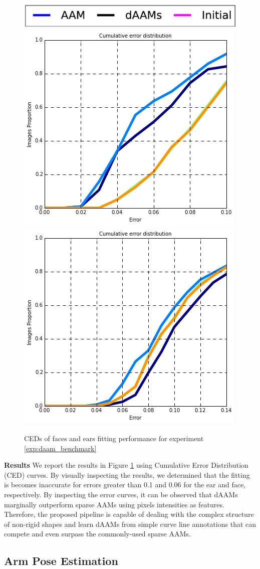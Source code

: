 \begin{figure}[b!]
    \centering
    \includegraphics[width=0.6\columnwidth]{resources/DAAMBenchmark/legend}
    \\
    \includegraphics[width=0.48\columnwidth]{resources/DAAMBenchmark/face}
    \includegraphics[width=0.48\columnwidth]{resources/DAAMBenchmark/ear}
    \caption{CEDs of faces and ears fitting performance for experiment \ref{exp:daam_benchmark}}
    \label{fig:daam_benchmark}
\end{figure}

\noindent\textbf{Results} We report the results in Figure \ref{fig:daam_benchmark} using Cumulative Error Distribution (CED) curves. By visually inspecting the results, we determined that the fitting is becomes inaccurate for errors greater than 0.1 and 0.06 for the ear and face, respectively. By inspecting the error curves, it can be observed that dAAMs marginally outperform sparse AAMs using pixels intensities as features. Therefore, the proposed pipeline is capable of dealing with the complex structure of non-rigid shapes and learn dAAMs from simple curve line annotations that can compete and even surpass the commonly-used sparse AAMs.


\subsection{Arm Pose Estimation}
\label{exp:benchmark}

